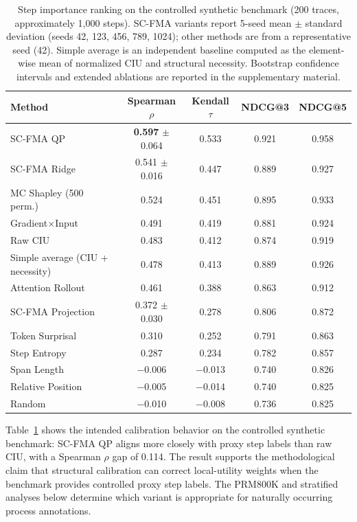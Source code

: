 \documentclass[a4paper,fleqn]{cas-sc}
\begin{document}
\begin{table}[ht]
\caption{Step importance ranking on the controlled synthetic benchmark (200 traces, approximately 1,000 steps). SC-FMA variants report 5-seed mean $\pm$ standard deviation (seeds 42, 123, 456, 789, 1024); other methods are from a representative seed (42). Simple average is an independent baseline computed as the element-wise mean of normalized CIU and structural necessity. Bootstrap confidence intervals and extended ablations are reported in the supplementary material.}
\label{tab:ranking-results}
\centering
\small
\begin{tabular}{lcccc}
\toprule
\textbf{Method} & \textbf{Spearman $\rho$} & \textbf{Kendall $\tau$} & \textbf{NDCG@3} & \textbf{NDCG@5} \\
\midrule
SC-FMA QP                  & \textbf{0.597} $\pm$ 0.064 & 0.533 & 0.921 & 0.958 \\
SC-FMA Ridge               & 0.541 $\pm$ 0.016 & 0.447 & 0.889 & 0.927 \\
MC Shapley (500 perm.)     & 0.524 & 0.451 & 0.895 & 0.933 \\
Gradient$\times$Input      & 0.491 & 0.419 & 0.881 & 0.924 \\
Raw CIU                    & 0.483 & 0.412 & 0.874 & 0.919 \\
Simple average (CIU + necessity) & 0.478 & 0.413 & 0.889 & 0.926 \\
Attention Rollout          & 0.461 & 0.388 & 0.863 & 0.912 \\
SC-FMA Projection          & 0.372 $\pm$ 0.030 & 0.278 & 0.806 & 0.872 \\
Token Surprisal            & 0.310 & 0.252 & 0.791 & 0.863 \\
Step Entropy               & 0.287 & 0.234 & 0.782 & 0.857 \\
Span Length                & $-$0.006 & $-$0.013 & 0.740 & 0.826 \\
Relative Position          & $-$0.005 & $-$0.014 & 0.740 & 0.825 \\
Random                     & $-$0.010 & $-$0.008 & 0.736 & 0.825 \\
\bottomrule
\end{tabular}
\end{table}

Table~\ref{tab:ranking-results} shows the intended calibration behavior on the controlled synthetic benchmark: SC-FMA QP aligns more closely with proxy step labels than raw CIU, with a Spearman $\rho$ gap of 0.114. The result supports the methodological claim that structural calibration can correct local-utility weights when the benchmark provides controlled proxy step labels. The PRM800K and stratified analyses below determine which variant is appropriate for naturally occurring process annotations.
\end{document}
